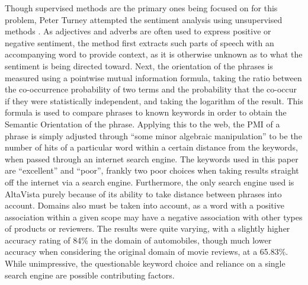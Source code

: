 Though supervised methods are the primary ones being focused on for this problem, Peter Turney attempted the sentiment analysis using unsupervised methods \cite{Turney:2002:TUT:1073083.1073153}. As adjectives and adverbs are often used to express positive or negative sentiment, the method first extracts such parts of speech with an accompanying word to provide context, as it is otherwise unknown as to what the sentiment is being directed toward. Next, the orientation of the phrases is measured using a pointwise mutual information formula, taking the ratio between the co-occurrence probability of two terms and the probability that the co-occur if they were statistically independent, and taking the logarithm of the result. This formula is used to compare phrases to known keywords in order to obtain the Semantic Orientation of the phrase. Applying this to the web, the PMI of a phrase is simply adjusted through “some minor algebraic manipulation” to be the number of hits of a particular word within a certain distance from the keywords, when passed through an internet search engine. The keywords used in this paper are “excellent” and “poor”, frankly two poor choices when taking results straight off the internet via a search engine. Furthermore, the only search engine used is AltaVista purely because of its ability to take distance between phrases into account. Domains also must be taken into account, as a word with a positive association within a given scope may have a negative association with other types of products or reviewers. The results were quite varying, with a slightly higher accuracy rating of 84\% in the domain of automobiles, though much lower accuracy when considering the original domain of movie reviews, at a 65.83\%. While unimpressive, the questionable keyword choice and reliance on a single search engine are possible contributing factors.
